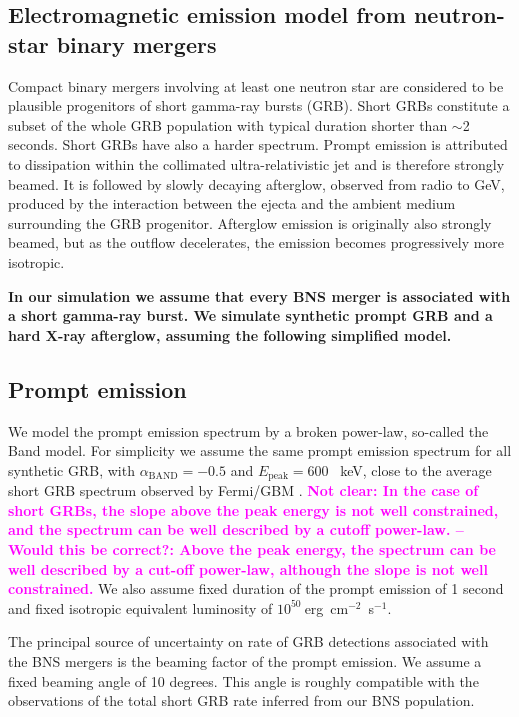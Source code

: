 \documentclass[a0,portrait]{a0poster}
\renewcommand{\emph}[1]{\textbf{\color{blue}#1}}
\newcommand{\ECM}[1] {\textbf{\textcolor{magenta}{#1}}}
\begin{document}
\begin{multicols}{2}
\section*{Electromagnetic emission model from neutron-star binary mergers}
Compact binary mergers involving at least one neutron star are considered to be
plausible progenitors of short gamma-ray bursts (GRB). Short GRBs constitute a
subset of the whole GRB population with typical duration shorter than $\sim$2
seconds. Short GRBs have also a harder spectrum.  Prompt emission is attributed
to dissipation within the collimated ultra-relativistic jet and is therefore
strongly beamed. It is followed by slowly decaying afterglow, observed from
radio to GeV, produced by the interaction between the ejecta and the ambient
medium surrounding the GRB progenitor. Afterglow emission is originally also
strongly beamed, but as the outflow decelerates, the emission becomes
progressively more isotropic.

\emph{In our simulation we assume that every BNS merger is associated with a short
gamma-ray burst. We simulate synthetic prompt GRB and a hard X-ray afterglow,
assuming the following simplified model.}

\subsection*{Prompt emission}
We model the prompt emission spectrum by a broken power-law, so-called the Band
\cite{band93} model. For simplicity we assume the same prompt emission spectrum
for all synthetic GRB, with $\alpha_{\mathrm{BAND}} = - 0.5$ and $E_{\mathrm{peak}} =
600$ \, keV, close to the average short GRB spectrum observed by Fermi/GBM
\cite{gruber14}.  \ECM{Not clear: In the case of short GRBs, the slope above the
  peak energy is not well constrained, and the spectrum can be well described by
  a cutoff power-law. -- Would this be correct?: Above the peak energy, the
  spectrum can be well described by a cut-off power-law, although the slope is
  not well constrained.} We also assume fixed duration of the prompt emission of
1 second and fixed isotropic equivalent luminosity of
$10^{50}~$erg~cm$^{-2}$~s$^{-1}$.

The principal source of uncertainty on rate of GRB detections
associated with the BNS mergers is the beaming factor of the prompt
emission. We assume a fixed beaming angle of 10 degrees. This angle is
roughly compatible with the observations of the total short GRB rate
inferred from our BNS population.


\end{multicols}
\end{document}
